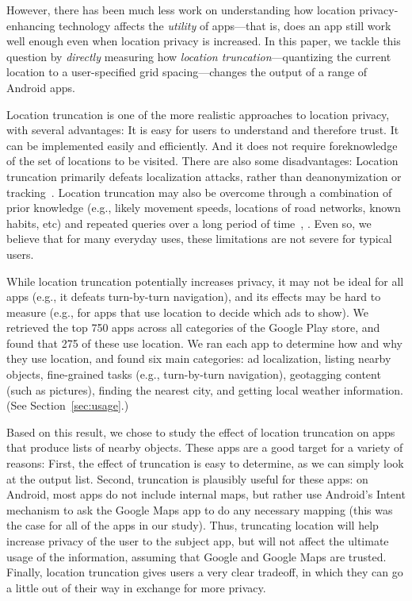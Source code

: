 \documentclass[10pt, conference, compsocconf]{IEEEtran}
\newcommand{\numinvestigatedapps}{750\xspace}
\newcommand{\numappsusinglocation}{275\xspace}
\begin{document}
However, there has been much less work \cite{Brush:2010} 
 on understanding
how location privacy-enhancing technology affects the \emph{utility}
of apps---that is, does an app still work well enough even when
location privacy is increased.  In this paper, we tackle this question
by \emph{directly} measuring how \emph{location truncation}---quantizing the
current location to a user-specified grid spacing---changes the output
of a range of Android apps.

Location truncation is one of the more realistic
approaches to location privacy, with several advantages: It is easy
for users to understand and therefore trust.  It can be implemented
easily and efficiently. And it does not require foreknowledge of the
set of locations to be visited. There are also some
disadvantages: Location truncation primarily defeats localization
attacks, rather than deanonymization or tracking~\cite{Krumm:2009}.
Location truncation may also be overcome through a
combination of prior knowledge (e.g., likely movement speeds,
locations of road networks, known habits, etc) and repeated queries
over a long period of time~\cite{Gruteser:2005}, \cite{Krumm:2007}.
Even so, we believe that for many everyday uses, these limitations are
not severe for typical users.

While location truncation potentially increases privacy, it may not be
ideal for all apps (e.g., it defeats turn-by-turn navigation), and its
effects may be hard to measure (e.g., for apps that use location to
decide which ads to show).  We retrieved the top \numinvestigatedapps apps
across all categories of the Google Play store, and found that
\numappsusinglocation of these use location. We ran each app
to determine how and why they use location, and found six main
categories: ad
localization, listing nearby objects, fine-grained tasks (e.g.,
turn-by-turn navigation), geotagging content (such as pictures),
finding the nearest city, and getting local weather information. (See
Section~\ref{sec:usage}.)

Based on this result, we chose to study the effect of location
truncation on apps that produce lists of nearby objects. 
These apps
are a good target for a variety of reasons: First, the effect of
truncation is easy to determine, as we can simply look at the output
list. Second, truncation is plausibly useful for these apps: on
Android, most apps do not include internal maps, but rather use
Android's Intent mechanism to ask the Google Maps app to do any
necessary mapping (this was the case for all of the apps in our study).
Thus, truncating location will help increase privacy of the user to
the subject app, but will not affect the ultimate usage of the
information, assuming that Google and Google Maps are
trusted. 
Finally, location truncation gives users a very clear
tradeoff, in which they can go a little out of their way
 in exchange for more privacy.
\end{document}
